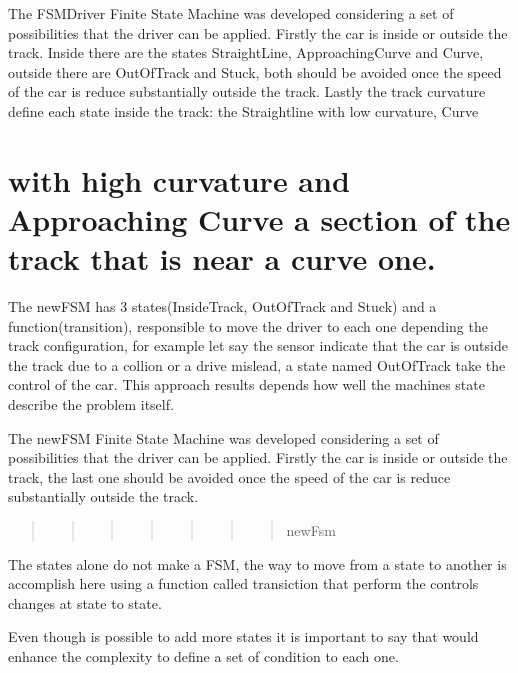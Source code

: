The F\+S\+M\+Driver Finite State Machine was developed considering a set of possibilities that the driver can be applied. Firstly the car is inside or outside the track. Inside there are the states Straight\+Line, Approaching\+Curve and Curve, outside there are Out\+Of\+Track and Stuck, both should be avoided once the speed of the car is reduce substantially outside the track. Lastly the track curvature define each state inside the track\+: the Straightline with low curvature, Curve \section*{with high curvature and Approaching Curve a section of the track that is near a curve one. }

The new\+F\+S\+M has 3 states(\+Inside\+Track, Out\+Of\+Track and Stuck) and a function(transition), responsible to move the driver to each one depending the track configuration, for example let say the sensor indicate that the car is outside the track due to a collion or a drive mislead, a state named Out\+Of\+Track take the control of the car. This approach results depends how well the machine\textquotesingle{}s state describe the problem itself.

The new\+F\+S\+M Finite State Machine was developed considering a set of possibilities that the driver can be applied. Firstly the car is inside or outside the track, the last one should be avoided once the speed of the car is reduce substantially outside the track. \begin{quote}
\begin{quote}
\begin{quote}
\begin{quote}
\begin{quote}
\begin{quote}
\begin{quote}
new\+Fsm \end{quote}
\end{quote}
\end{quote}
\end{quote}
\end{quote}
\end{quote}
\end{quote}


The states alone do not make a F\+S\+M, the way to move from a state to another is accomplish here using a function called transiction that perform the control\textquotesingle{}s changes at state to state.

Even though is possible to add more states it is important to say that would enhance the complexity to define a set of condition to each one. 